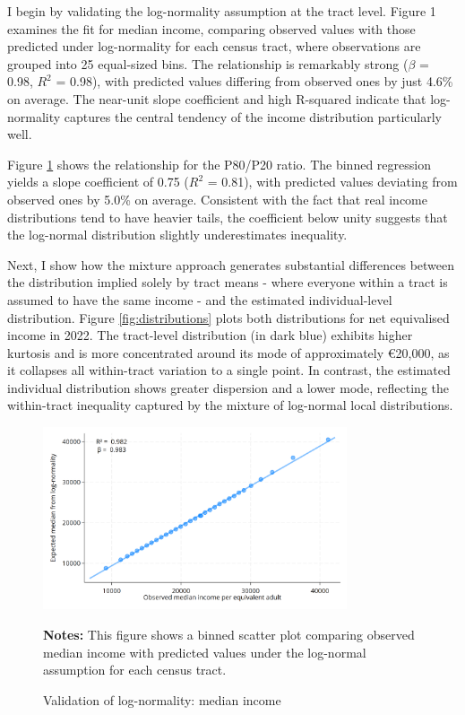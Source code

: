 
I begin by validating the log-normality assumption at the tract level. Figure 1 examines the fit for median income, comparing observed values with those predicted under log-normality for each census tract, where observations are grouped into 25 equal-sized bins. The relationship is remarkably strong ($\beta$ = 0.98, $R^2$ = 0.98), with predicted values differing from observed ones by just 4.6\% on average. The near-unit slope coefficient and high R-squared indicate that log-normality captures the central tendency of the income distribution particularly well.

Figure \ref{fig:median} shows the relationship for the P80/P20 ratio. The binned regression yields a slope coefficient of 0.75 ($R^2$ = 0.81), with predicted values deviating from observed ones by 5.0\% on average. Consistent with the fact that real income distributions tend to have heavier tails, the coefficient below unity suggests that the log-normal distribution slightly underestimates inequality.

Next, I show how the mixture approach generates substantial differences between the distribution implied solely by tract means - where everyone within a tract is assumed to have the same income - and the estimated individual-level distribution. Figure \ref{fig:distributions} plots both distributions for net equivalised income in 2022. The tract-level distribution (in dark blue) exhibits higher kurtosis and is more concentrated around its mode of approximately €20,000, as it collapses all within-tract variation to a single point. In contrast, the estimated individual distribution shows greater dispersion and a lower mode, reflecting the within-tract inequality captured by the mixture of log-normal local distributions. 

\begin{figure}[H]
\begin{center}
\captionsetup{justification=centering}
\caption{Validation of log-normality: median income}
\label{fig:median}
\includegraphics[width=0.8\textwidth]{output/binned_scatter_median.png}
\end{center}
\begin{fignotes2}
\textbf{Notes:} This figure shows a binned scatter plot comparing observed median income with predicted values under the log-normal assumption for each census tract. 
\end{fignotes2}
\end{figure}

